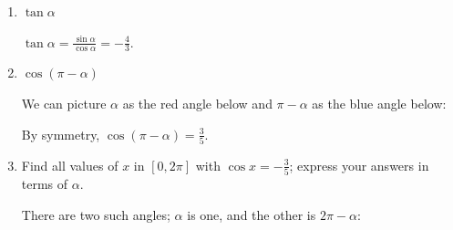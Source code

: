\documentclass{article}
\begin{document}
\begin{enumerate}
\begin{enumerate}
      \begin{solution}
        By the Pythagorean identity, $\sin^2(\alpha) + \cos^2(\alpha) =
        1$, so $\sin^2(\alpha) = 1 - \left( - \frac{3}{5} \right)^2 =
        \frac{16}{25}$.  Therefore, $\sin \alpha$ is either
        $\frac{4}{5}$ or $- \frac{4}{5}$.  Since $\alpha$ is
        in $[0, \pi]$, $\sin \alpha$ must be positive, so it is
        $\boxed{\frac{4}{5}}$.
      \end{solution}

    \item
      \begin{problem}[\vfill]
        $\tan \alpha$
      \end{problem}

      \begin{solution}
        $\displaystyle \tan \alpha = \frac{\sin \alpha}{\cos \alpha} = 
        \boxed{-\frac{4}{3}}$.
      \end{solution}

    \item
      \begin{problem}[\vfill]
        $\cos(\pi - \alpha)$
      \end{problem}

      \begin{solution}
        We can picture $\alpha$ as the red angle below and $\pi -
        \alpha$ as the blue angle below:
        \begin{center}
          \begin{tikzangle}[angle=rad(acos(-3/5)),
            secondangle=pi-\angle, xtick={-0.6},
            xticklabels={$-\frac{3}{5}$}]             
          \end{tikzangle}
        \end{center}
        By symmetry, $\cos(\pi - \alpha) = \boxed{\frac{3}{5}}$. 
      \end{solution}

  \item
\begin{problem}[\vfill]
      Find all values of $x$ in $[0, 2\pi]$ with $\cos x = -
      \frac{3}{5}$; express your answers in terms of $\alpha$.
    \end{problem}

    \begin{solution}
      There are two such angles; $\alpha$ is one, and the other is $2\pi-\alpha$:
      \begin{center}
          \begin{tikzangle}[angle=rad(acos(-3/5)),
            label = $\alpha$, secondlabel = $2\pi-\alpha$, 
            secondangle=-\angle, xtick={-0.6},
            xticklabels={$-\frac{3}{5}$}, func=cos]             
          \end{tikzangle}
      \end{center}
    \end{solution}


\end{enumerate}
\end{enumerate}
\end{document}

